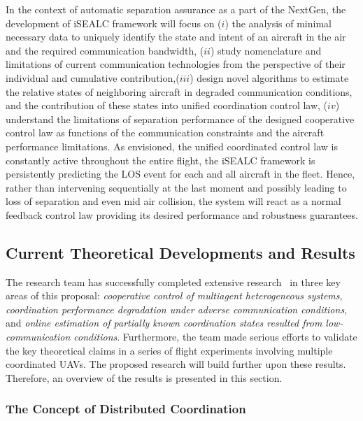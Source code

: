 \documentclass[letter,onecolumn,12pt]{aiaa-tc}
\newcommand{\1}{1_n}
\begin{document}
In the context of automatic separation assurance as a part of the NextGen, the development of iSEALC framework will focus on ($i$) the analysis of  minimal necessary data to uniquely identify the state and intent of an aircraft in the air and the required communication bandwidth, ($ii$) study nomenclature and limitations of current communication technologies from the perspective of their individual and cumulative contribution,($iii$) design novel algorithms to estimate the relative states of  neighboring aircraft in degraded communication conditions, and the contribution of these states into unified coordination control law, ($iv$) understand the limitations of separation performance of the designed cooperative control law as functions of the communication constraints and the aircraft performance limitations. As envisioned, the unified coordinated control law is constantly active throughout the entire flight, the iSEALC framework is persistently predicting the LOS event for each and all aircraft in the fleet. Hence, rather than intervening sequentially at the last moment and possibly leading to loss of separation and even mid air collision, the system will react as a normal feedback control law providing its desired performance and robustness guarantees.

\subsection{Current Theoretical Developments and Results}
\label{subsec:current_develop}

The research team has successfully completed extensive research~\cite{xargay2012csm} in three key areas of this proposal: \emph{cooperative control of multiagent heterogeneous systems}, \emph{coordination performance degradation under adverse communication conditions}, and \emph{online estimation of partially known coordination states resulted from low-communication conditions}. Furthermore, the team made serious efforts to validate the key theoretical claims in a series of flight experiments involving multiple coordinated UAVs. The proposed research will build further upon these results. Therefore, an overview of the results is presented in this section.

\subsubsection{The Concept of Distributed Coordination }
\end{document}
